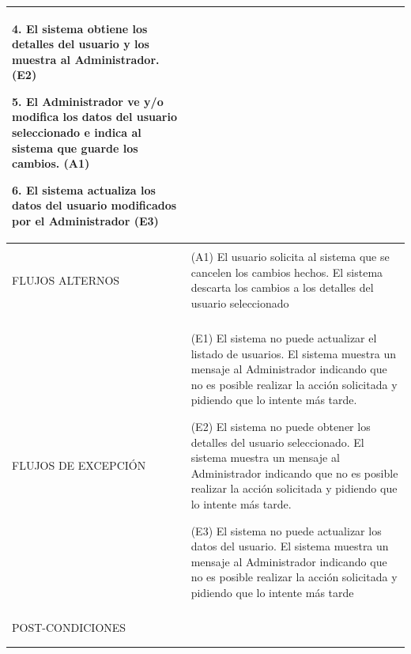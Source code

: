 \begin{longtable}{@{\extracolsep{8pt}}l p{8.5cm}}
 4. El sistema obtiene los detalles del usuario y los muestra al Administrador. (E2) \par\vspace{.1cm}

 5. El Administrador ve y/o modifica los datos del usuario seleccionado e indica al sistema que guarde los cambios. (A1) \par\vspace{.1cm}

 6. El sistema actualiza los datos del usuario modificados por el Administrador (E3) \par\vspace{.1cm}

\\
\hline \\[-1ex]

FLUJOS ALTERNOS & 
\par\vspace{.1cm} (A1) El usuario solicita al sistema que se cancelen los cambios hechos. El sistema descarta los cambios a los detalles del usuario seleccionado



\\
\hline \\[-1ex]

FLUJOS DE EXCEPCIÓN & 
\par\vspace{.1cm} (E1) El sistema no puede actualizar el listado de usuarios. El sistema muestra un mensaje al Administrador indicando que no es posible realizar la acción solicitada y pidiendo que lo intente más tarde.

\par\vspace{.1cm} (E2) El sistema no puede obtener los detalles del usuario seleccionado. El sistema muestra un mensaje al Administrador indicando que no es posible realizar la acción solicitada y pidiendo que lo intente más tarde.

\par\vspace{.1cm} (E3) El sistema no puede actualizar los datos del usuario. El sistema muestra un mensaje al Administrador indicando que no es posible realizar la acción solicitada y pidiendo que lo intente más tarde


\\%

\hline \\[-1ex]
POST-CONDICIONES & 
\\
\hline 
\hline \\[-1.8ex]
 \\
\end{longtable}


